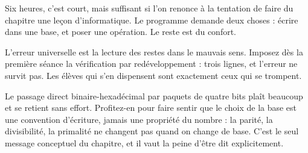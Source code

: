 \begin{notepourlaclasse}
Six heures, c'est court, mais suffisant si l'on renonce à la tentation de
faire du chapitre une leçon d'informatique. Le programme demande deux choses :
écrire dans une base, et poser une opération. Le reste est du confort.

L'erreur universelle est la lecture des restes dans le mauvais sens. Imposez
dès la première séance la vérification par redéveloppement : trois lignes, et
l'erreur ne survit pas. Les élèves qui s'en dispensent sont exactement ceux
qui se trompent.

Le passage direct binaire-hexadécimal par paquets de quatre bits plaît
beaucoup et se retient sans effort. Profitez-en pour faire sentir que le choix
de la base est une convention d'écriture, jamais une propriété du nombre : la
parité, la divisibilité, la primalité ne changent pas quand on change de base.
C'est le seul message conceptuel du chapitre, et il vaut la peine d'être dit
explicitement.
\end{notepourlaclasse}
